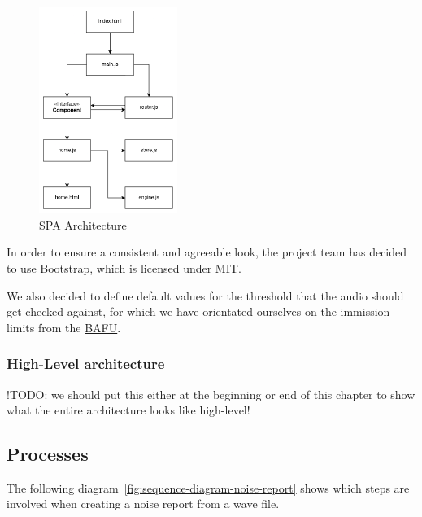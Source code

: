\begin{figure}[H]
    \centering
    \includegraphics[width=0.4\textwidth]{../assets/spa_diagram.png}
    \caption{SPA Architecture}\label{fig:spa-architecture}
\end{figure}

In order to ensure a consistent and agreeable look, the project team has decided to use \href{https://getbootstrap.com/}{Bootstrap}, which is \href{https://github.com/twbs/bootstrap/blob/main/LICENSE}{licensed under MIT}.

We also decided to define default values for the threshold that the audio should get checked against,
for which we have orientated ourselves on the immission limits from the \href{https://www.bafu.admin.ch/bafu/de/home/themen/laerm/fachinformationen/laermbelastung/grenzwerte-fuer-laerm/belastungsgrenzwerte-fuer-laerm.html}{BAFU}.

\subsubsection{High-Level architecture}
!TODO: we should put this either at the beginning or end of this chapter to show what the entire architecture looks like high-level!

\subsection{Processes}
The following diagram~\ref{fig:sequence-diagram-noise-report} shows which steps are involved when creating a noise report from a wave file.

